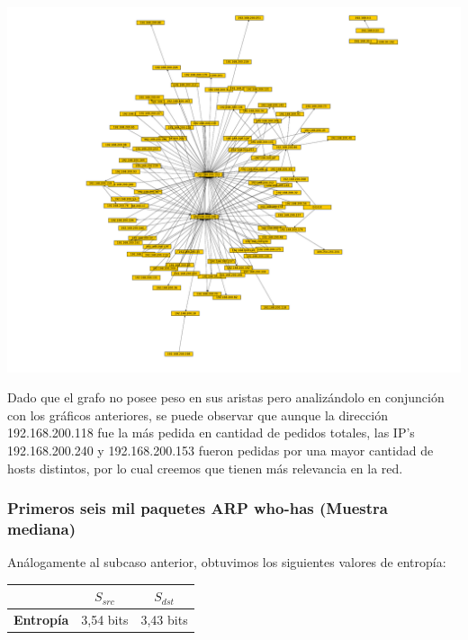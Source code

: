 \includegraphics[scale=0.7,clip=true,trim=140 0 0 0]{graphics/laburochico.pdf}


\indent Dado que el grafo no posee peso en sus aristas pero analizándolo en conjunción con los gráficos anteriores, se puede observar que aunque la dirección 192.168.200.118 fue la más pedida en cantidad de pedidos totales, las IP's 192.168.200.240 y 192.168.200.153 fueron pedidas por una mayor cantidad de hosts distintos, por lo cual creemos que tienen más relevancia en la red.\\

\subsubsection{Primeros seis mil paquetes ARP who-has (Muestra mediana)}

\indent \indent Análogamente al subcaso anterior, obtuvimos los siguientes valores de entropía:\\

\begin{center}
	\begin{tabular}{ | c | c | c |} \hline
	   & \textbf{$S_{src}$} & \textbf{$S_{dst}$} \\ \hline
	  	\textbf{Entropía} & 3,54 bits & 3,43 bits \\ \hline
	\end{tabular}
\end{center}

